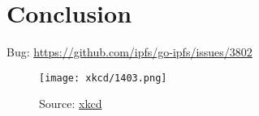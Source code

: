 \chapter{Conclusion}
\label{cha:conclusion}


Bug: \url{https://github.com/ipfs/go-ipfs/issues/3802}


\begin{figure}[ht]
    \centering
    \texttt{[image: xkcd/1403.png]}
    \caption*{Source: \href{https://xkcd.com/1403/}{xkcd}}
\end{figure}



